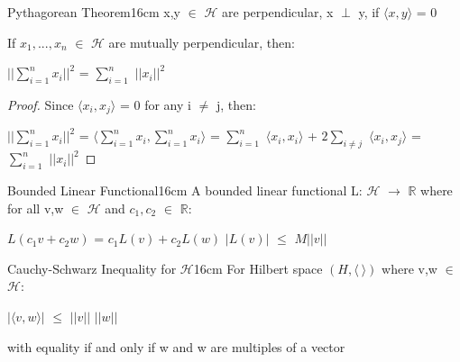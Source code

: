     \vspace{0.5cm}



    \begin{wtheorem}{Pythagorean Theorem}{16cm}
        x,y $\in$ $\mathcal{H}$ are {\color{lblue} perpendicular}, x $\perp$ y,
        if $\langle x , y \rangle$ = 0

        If $x_1,...,x_n$ $\in$ $\mathcal{H}$ are mutually perpendicular, then:

        \hspace{0.5cm}
        $|| \sum_{i=1}^n x_i ||^2$
        = $\sum_{i=1}^n$ $||x_i||^2$
    \end{wtheorem}

    \begin{proof}
        Since $\langle x_i , x_j \rangle$ = 0 for any i $\not =$ j, then:

        \hspace{0.5cm}
        $|| \sum_{i=1}^n x_i ||^2$
        = $\langle \sum_{i=1}^n x_i , \sum_{i=1}^n x_i \rangle$
        = $\sum_{i=1}^n$ $\langle x_i , x_i \rangle$
            + $2 \sum_{i \not = j}$ $\langle x_i , x_j \rangle$
        = $\sum_{i=1}^n$ $||x_i||^2$
    \end{proof}

    \vspace{0.5cm}



    \begin{definition}{Bounded Linear Functional}{16cm}
        A {\color{lblue} bounded linear functional}
        L: $\mathcal{H}$ $\rightarrow$ $\mathbb{R}$
        where for all v,w $\in$ $\mathcal{H}$ and $c_1,c_2$ $\in$ $\mathbb{R}$:

        \hspace{0.5cm}
        $L(c_1v+c_2w)$ = $c_1L(v) + c_2L(w)$
        \hspace{1cm}
        $|L(v)|$ $\leq$ $M||v||$
    \end{definition}

    \vspace{0.5cm}



    \begin{wtheorem}{Cauchy-Schwarz Inequality for $\mathcal{H}$}{16cm}
        For Hilbert space $(H, \langle \ \rangle)$ where v,w $\in$ $\mathcal{H}$:

        \hspace{0.5cm}
        $|\langle v , w \rangle|$
        $\leq$ $||v||$ $||w||$

        with equality if and only if w and w are multiples of a vector
    \end{wtheorem}

